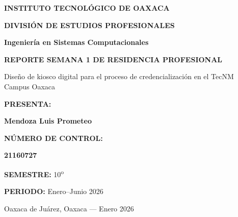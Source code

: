 \documentclass[12pt,a4paper]{article}
\newcommand{\Carrera}{Ingeniería en Sistemas Computacionales}
\newcommand{\TipoDocumento}{REPORTE SEMANA 1 DE RESIDENCIA PROFESIONAL}
\newcommand{\TituloProyecto}{Diseño de kiosco digital para el proceso de credencialización en el TecNM Campus Oaxaca}
\newcommand{\Alumno}{Mendoza Luis Prometeo}
\newcommand{\NoControl}{21160727}
\newcommand{\Semestre}{10\textsuperscript{o}}
\newcommand{\Periodo}{Enero--Junio 2026}
\newcommand{\LugarFecha}{Oaxaca de Juárez, Oaxaca --- Enero 2026}
\begin{document}
\begin{center}

  {\large \textbf{INSTITUTO TECNOLÓGICO DE OAXACA}\par}
  \vspace{0.4cm}
  {\large \textbf{DIVISIÓN DE ESTUDIOS PROFESIONALES}\par}

  \vspace{1.2cm}
  {\normalsize \textbf{\Carrera}\par}

  \vspace{1.2cm}
  {\normalsize \textbf{\TipoDocumento}\par}

  \vspace{1.2cm}
  {\normalsize \TituloProyecto\par}

  \vspace{1.6cm}
  {\normalsize \textbf{PRESENTA:}\par}
  \vspace{0.2cm}
  {\normalsize \textbf{\Alumno}\par}

  \vspace{1.6cm}
  {\normalsize \textbf{NÚMERO DE CONTROL:}\par}
  \vspace{0.2cm}
  {\normalsize \textbf{\NoControl}\par}

  \vspace{2.0cm}
  {\normalsize \textbf{SEMESTRE:} \Semestre\par}
  \vspace{0.2cm}
  {\normalsize \textbf{PERIODO:} \Periodo\par}

  \vfill
  {\normalsize \LugarFecha\par}
\end{center}

\clearpage

\setcounter{page}{2}
\setlength{\headheight}{14.5pt} %
\pagestyle{fancy}
\fancyhf{}
\renewcommand{\headrulewidth}{0.4pt}

\tableofcontents
\clearpage
\end{document}
